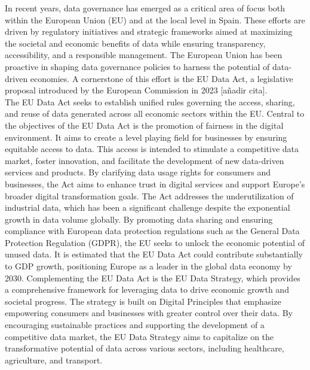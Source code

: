 In recent years, data governance has emerged as a critical area of focus both within the European Union (EU) and at the local level in Spain. These efforts are driven by regulatory initiatives and strategic frameworks aimed at maximizing the societal and economic benefits of data while ensuring transparency, accessibility, and a responsible management. The European Union has been proactive in shaping data governance policies to harness the potential of data-driven economies. A cornerstone of this effort is the EU Data Act, a legislative proposal introduced by the European Commission in 2023 [añadir cita].\\
The EU Data Act seeks to establish unified rules governing the access, sharing, and reuse of data generated across all economic sectors within the EU.
Central to the objectives of the EU Data Act is the promotion of fairness in the digital environment. It aims to create a level playing field for businesses by ensuring equitable access to data. This access is intended to stimulate a competitive data market, foster innovation, and facilitate the development of new data-driven services and products. By clarifying data usage rights for consumers and businesses, the Act aims to enhance trust in digital services and support Europe's broader digital transformation goals.
The Act addresses the underutilization of industrial data, which has been a significant challenge despite the exponential growth in data volume globally. By promoting data sharing and ensuring compliance with European data protection regulations such as the General Data Protection Regulation (GDPR), the EU seeks to unlock the economic potential of unused data. It is estimated that the EU Data Act could contribute substantially to GDP growth, positioning Europe as a leader in the global data economy by 2030. Complementing the EU Data Act is the EU Data Strategy, which provides a comprehensive framework for leveraging data to drive economic growth and societal progress. The strategy is built on Digital Principles that emphasize empowering consumers and businesses with greater control over their data. By encouraging sustainable practices and supporting the development of a competitive data market, the EU Data Strategy aims to capitalize on the transformative potential of data across various sectors, including healthcare, agriculture, and transport.\\

